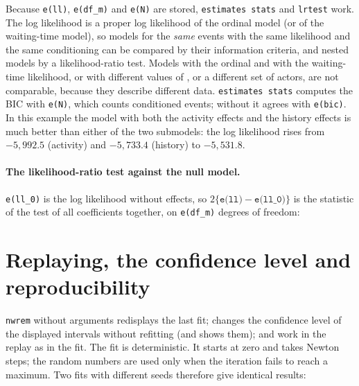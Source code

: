 Because \texttt{e(ll)}, \texttt{e(df\_m)} and \texttt{e(N)} are stored, \texttt{estimates stats} and \texttt{lrtest} work. The log likelihood is a proper log likelihood of the ordinal model (or of the waiting-time model), so models for the \emph{same} events with the same likelihood and the same conditioning can be compared by their information criteria, and nested models by a likelihood-ratio test. Models with the ordinal and with the waiting-time likelihood, or with different values of ,  or a different set of actors, are not comparable, because they describe different data. \texttt{estimates stats} computes the BIC with \texttt{e(N)}, which counts conditioned events; without  it agrees with \texttt{e(bic)}.
In this example the model with both the activity effects and the history effects is much better than either of the two submodels: the log likelihood rises from $-5{,}992.5$ (activity) and $-5{,}733.4$ (history) to $-5{,}531.8$.

\paragraph{The likelihood-ratio test against the null model.} \texttt{e(ll\_0)} is the log likelihood without effects, so $2\{\texttt{e(ll)}-\texttt{e(ll\_0)}\}$ is the statistic of the test of all coefficients together, on \texttt{e(df\_m)} degrees of freedom:

\section{Replaying, the confidence level and reproducibility}

\texttt{nwrem} without arguments redisplays the last fit;  changes the confidence level of the displayed intervals without refitting (and shows them);  and  work in the replay as in the fit.
The fit is deterministic. It starts at zero and takes Newton steps; the random numbers are used only when the iteration fails to reach a maximum. Two fits with different seeds therefore give identical results:
